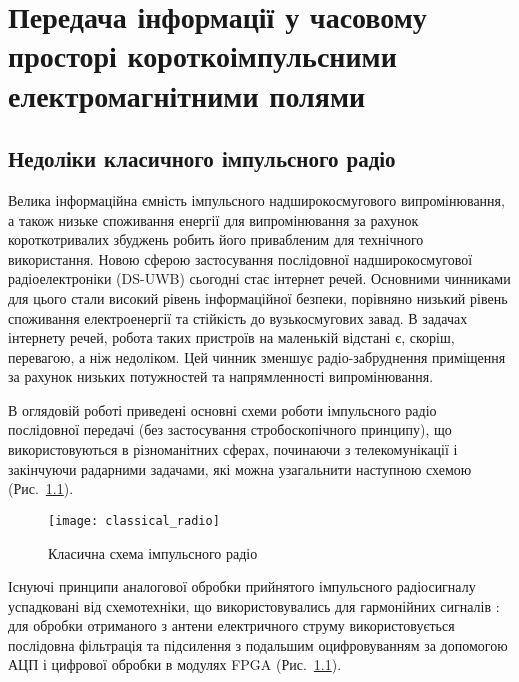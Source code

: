 \chapter{Передача інформації у часовому просторі короткоімпульсними 
електромагнітними полями}
\label{ch:neuron}

\section{Недоліки класичного імпульсного радіо}

Велика інформаційна ємність імпульсного надширокосмугового випромінювання, 
а також низьке споживання енергії для випромінювання за рахунок 
короткотривалих збуджень робить його привабленим для технічного використання.
Новою сферою застосування послідовної надширокосмугової радіоелектроніки 
(DS-UWB) сьогодні стає інтернет речей. Основними чинниками для цього стали 
високий рівень інформаційної безпеки, порівняно низький рівень споживання 
електроенергії та стійкість до вузькосмугових завад. 
В задачах інтернету речей, робота таких пристроїв на маленькій відстані є, 
скоріш, перевагою, а ніж недоліком. Цей чинник зменшує радіо-забруднення 
приміщення за рахунок низьких потужностей та напрямленності випромінювання.

В оглядовій роботі \cite{imp:ChannelImplementation} приведені основні схеми
роботи імпульсного радіо послідовної передачі (без застосування 
стробоскопічного принципу), що використовуються в різноманітних сферах, 
починаючи з телекомунікації і закінчуючи радарними задачами, які можна 
узагальнити наступною схемою (Рис.~\ref{fig:emp_radio}).

\begin{figure}[htbp] \begin{center}
\texttt{[image: classical\_radio]}
\caption{Класична схема імпульсного радіо} \label{fig:emp_radio}
\end{center} \end{figure}

Існуючі принципи аналогової обробки прийнятого імпульсного радіосигналу 
успадковані від схемотехніки, що використовувались для гармонійних сигналів 
\cite{imp:ComunicationsOverview}: для обробки отриманого з антени 
електричного струму використовується послідовна фільтрація та підсилення з 
подальшим оцифровуванням за допомогою АЦП і цифрової обробки в модулях FPGA 
(Рис.~\ref{fig:emp_radio}).

